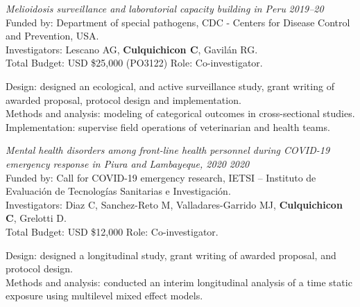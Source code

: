 \documentclass[10pt]{article}
\newenvironment{outerlist}[1][\enskip\textbullet]%
{\begin{itemize}[#1]}{\end{itemize}%
	\vspace{-0.6\baselineskip}}
\newenvironment{innerlist}[1][\enskip$\circ$]%
{\begin{compactitem}[#1]}{\end{compactitem}}
\begin{document}
\vspace{-0.25in}
\begin{outerlist}
	\item[] {\it Melioidosis surveillance and laboratorial capacity building in Peru} \hfill {\it 2019--20}\\
	Funded by: Department of special pathogens, CDC - Centers for Disease Control and Prevention, USA.
	\\
	Investigators: Lescano AG, {\bf Culquichicon C}, Gavilán RG. \\
	Total Budget: USD \$25,000 (PO3122) \hfill Role: Co-investigator.
	\begin{innerlist}
		\item[] 	Design: designed an ecological, and active surveillance study, grant writing of awarded proposal, protocol design and implementation.\\
					Methods and analysis: modeling of categorical outcomes in cross-sectional studies.\\
					Implementation: supervise field operations of veterinarian and health teams.
	\end{innerlist}
	
\end{outerlist}


\vspace{-0.10in}
\begin{outerlist}
	\item[] {\it Mental health disorders among front-line health personnel during COVID-19 emergency response in Piura and Lambayeque, 2020} \hfill {\it 2020}\\
	Funded by: Call for COVID-19 emergency research, IETSI – Instituto de Evaluación de Tecnologías Sanitarias e Investigación. \\
	Investigators: Diaz C, Sanchez-Reto M, Valladares-Garrido MJ, {\bf Culquichicon C}, Grelotti D. \\
	Total Budget: USD \$12,000  \hfill Role: Co-investigator.
	
	\begin{innerlist}
		\item[] 	Design: designed a longitudinal study, grant writing of awarded proposal, and protocol design. \\
					Methods and analysis: conducted an interim longitudinal analysis of a time static exposure using multilevel mixed effect models.\\

	\end{innerlist}
	
\end{outerlist}
\end{document}
